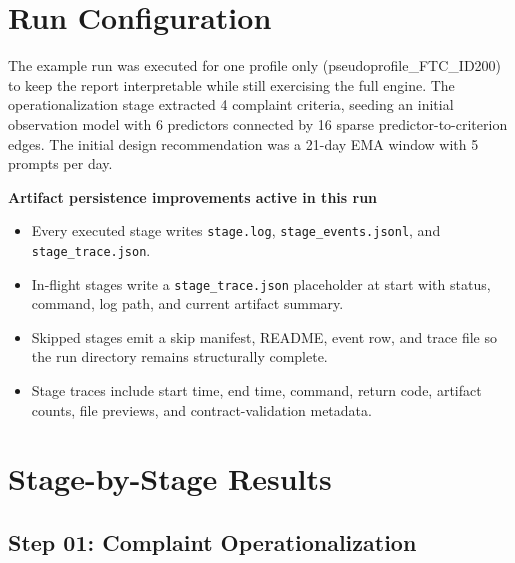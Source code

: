 \documentclass[11pt,a4paper]{article}
\newcommand{\ProfileID}{pseudoprofile\_FTC\_ID200}
\newcommand{\CriterionCount}{4}
\newcommand{\PredictorCount}{6}
\newcommand{\SparseEdgeCount}{16}
\newcommand{\StudyDays}{21}
\newcommand{\PromptsPerDay}{5}
\begin{document}
\section{Run Configuration}

The example run was executed for one profile only (\ProfileID) to keep the report interpretable while still exercising the full engine. The operationalization stage extracted \CriterionCount{} complaint criteria, seeding an initial observation model with \PredictorCount{} predictors connected by \SparseEdgeCount{} sparse predictor-to-criterion edges. The initial design recommendation was a \StudyDays{}-day EMA window with \PromptsPerDay{} prompts per day.

\begin{tcolorbox}[
  colback=PhoenixSoft,colframe=PhoenixBorder,
  boxrule=0.6pt,arc=1.5mm
]
\textbf{Artifact persistence improvements active in this run}
\begin{itemize}
\item Every executed stage writes \texttt{stage.log}, \texttt{stage\_events.jsonl}, and \texttt{stage\_trace.json}.
\item In-flight stages write a \texttt{stage\_trace.json} placeholder at start with status, command, log path, and current artifact summary.
\item Skipped stages emit a skip manifest, README, event row, and trace file so the run directory remains structurally complete.
\item Stage traces include start time, end time, command, return code, artifact counts, file previews, and contract-validation metadata.
\end{itemize}
\end{tcolorbox}

\section{Stage-by-Stage Results}

\subsection{Step 01: Complaint Operationalization}
\label{sec:step01}
\end{document}
